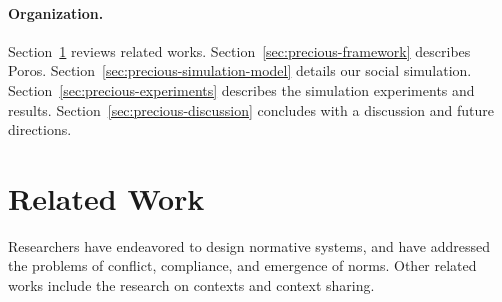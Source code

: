 \documentclass[11pt,          %
               phd,           %
               onehalfspacing %
               ]{ncsuthesis}
\makeatletter
\newcommand{\etal}{{et al.\@\xspace}}
\newcommand{\frameworkB}{Poros\xspace}
\newcommand{\mps}[1]{\textcolor{blue}{MPS:~~#1}}
\makeatother
\begin{document}
\paragraph{Organization.}
Section~\ref{sec:precious-related-work} reviews related works.
Section~\ref{sec:precious-framework} describes \frameworkB.
Section~\ref{sec:precious-simulation-model} details our social simulation.
Section~\ref{sec:precious-experiments} describes the simulation experiments and
results. Section~\ref{sec:precious-discussion} concludes with a discussion and
future directions.

\section{Related Work}
\label{sec:precious-related-work}

Researchers have endeavored to design normative systems, and have
addressed the problems of conflict, compliance, and emergence of norms.
Other related works include the research on contexts and context sharing. 


\end{document}

